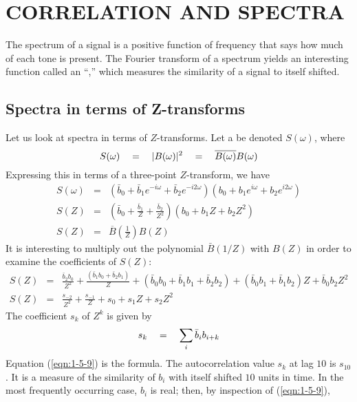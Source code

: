 \section{CORRELATION AND SPECTRA}
The spectrum of a signal is a positive function of frequency
that says how much of each tone is present.
The Fourier transform of a spectrum yields an interesting function
called an ``,''
which measures the similarity of a signal to itself shifted.

\subsection{Spectra in terms of Z-transforms}
Let us look at spectra in terms of $Z$-transforms.
Let a  be denoted $S(\omega)$, where
\begin{equation}
S(\omega) \quad =\quad |B(\omega)|^2 \quad =\quad \overline{B(\omega)}B(\omega)
\label{eqn:1-5-3}
\end{equation}
Expressing this in terms of a three-point $Z$-transform, we have
\begin{eqnarray}
S(\omega) & = & (\bar{b}_0+\bar{b}_1 e^{-i\omega} + 
		\bar{b}_2 e^{-i2\omega})
		(b_0 + b_1e^{i\omega} +b_2 e^{i2\omega})
							\\
S(Z) & = & \left(\bar{b}_0 +\frac{\bar{b}_1}{Z} +
		\frac{\bar{b}_2}{Z^2} \right)
		(b_0 + b_1Z + b_2Z^2 )			\\
S(Z) & = & \overline{B} \left(\frac{1}{Z}\right) B(Z)
\end{eqnarray}
It is interesting to multiply out
the polynomial $\bar{B}(1/Z)$ with $B(Z)$ in order
to examine the coefficients of $S(Z)$:
\begin{eqnarray}
S(Z) &=& \frac{\bar{b}_2b_0}{Z^2}  + 
	\frac{(\bar{b}_1b_0 + \bar{b}_2b_1)}{Z} +
	(\bar{b}_0b_0 + \bar{b}_1b_1 + \bar{b}_2 b_2)
    + (\bar{b}_0 b_1 + \bar{b}_1b_2)Z + \bar{b}_0 b_2 Z^2 \nonumber \\
S(Z) &=& \frac{s_{-2}}{Z^2} + \frac{s_{-1}}{Z} + s_0 + s_1Z + s_2 Z^2
\label{eqn:1-5-8}
\end{eqnarray}
The coefficient $s_k$ of $Z^k$ is given by
\begin{equation}
s_k \quad =\quad \sum_{i} \bar{b}_i b_{i+k}
\label{eqn:1-5-9}
\end{equation}
Equation (\ref{eqn:1-5-9}) is the
 formula.
The autocorrelation
value $s_k$ at lag $10$ is $s_{10}$.
It is a measure of the similarity of $b_i$
with itself shifted $10$ units in time.
In the most
frequently occurring case, $b_i$ is real; 
then, by inspection of (\ref{eqn:1-5-9}),
